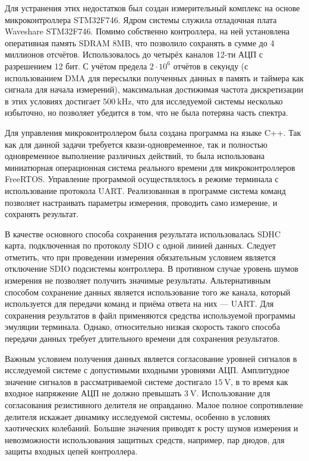 Для устранения этих недостатков был создан
измерительный комплекс на основе
микроконтроллера STM32F746.
Ядром системы служила отладочная плата Waveshare STM32F746.
Помимо собственно контроллера, на ней установлена оперативная память
SDRAM 8MB, что позволило сохранять в сумме до 4 миллионов отсчётов.
Использовалось до четырёх каналов 12-ти АЦП с разрешением 12 бит.
С учётом предела $2 \cdot 10^6$ отчётов в секунду
(с использованием DMA для пересылки полученных данных в память и таймера как сигнала для начала измерений),
максимальная достижимая частота дискретизации в этих условиях достигает $\SI{500}{\kilo\hertz}$,
что для исследуемой системы несколько избыточно,
но позволяет убедится в том, что не была потеряна часть спектра.

Для управления микроконтроллером была создана программа
на языке C++. Так как для данной задачи требуется
квази-одновременное, так и полностью одновременное выполнение
различных действий, то была использована миниатюрная операционная
система реального времени для микроконтроллеров FreeRTOS.
Управление программой осуществлялось в режиме терминала
с использование протокола UART. Реализованная
в программе система команд позволяет настраивать параметры измерения,
проводить само измерение, и сохранять результат.

В качестве основного способа сохранения результата
использовалась SDHC карта, подключенная по протоколу SDIO с одной линией данных.
Следует отметить, что при проведении измерения обязательным условием
является отключение SDIO подсистемы контроллера.
В противном случае уровень шумов измерения не позволяет
получить значимые результаты.
Альтернативным способом сохранение данных является
использование того же канала, который используется для передачи команд
и приёма ответа на них --- UART. Для сохранения результатов в файл
применяются средства используемой программы эмуляции терминала.
Однако, относительно низкая скорость такого способа передачи данных
требует длительного времени для сохранения результатов.

Важным условием получения данных является согласование уровней
сигналов в исследуемой системе с допустимыми входными уровнями АЦП.
Амплитудное значение сигналов в рассматриваемой системе достигало
$\SI{15}{\volt}$, в то время как входное напряжение АЦП не должно
превышать $\SI{3}{\volt}$.
Использование для согласования резистивного делителя
не оправданно. Малое полное сопротивление делителя
искажает динамику исследуемой системы, особенно в условиях
хаотических колебаний. Большие значения приводят
к росту шумов измерения и невозможности
использования защитных средств, например, пар диодов,
для защиты входных цепей контроллера.

